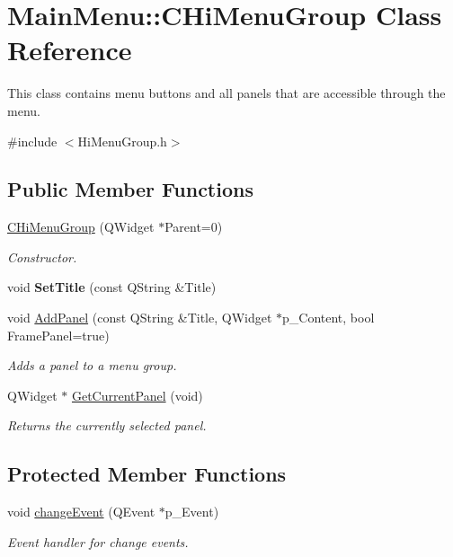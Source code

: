 \hypertarget{classMainMenu_1_1CHiMenuGroup}{\section{\-Main\-Menu\-:\-:\-C\-Hi\-Menu\-Group \-Class \-Reference}
\label{classMainMenu_1_1CHiMenuGroup}
}


\-This class contains menu buttons and all panels that are accessible through the menu.  




{\ttfamily \#include $<$\-Hi\-Menu\-Group.\-h$>$}

\subsection*{\-Public \-Member \-Functions}
\begin{DoxyCompactItemize}
\item 
\hyperlink{classMainMenu_1_1CHiMenuGroup_aaac78a584b5bbc709583957b60ecc8b9}{\-C\-Hi\-Menu\-Group} (\-Q\-Widget $\ast$\-Parent=0)
\begin{DoxyCompactList}\small\item\em \-Constructor. \end{DoxyCompactList}\item 
\hypertarget{classMainMenu_1_1CHiMenuGroup_ab48ee3eae074c54d57fbd2c24f73cbe0}{void {\bfseries \-Set\-Title} (const \-Q\-String \&\-Title)}\label{classMainMenu_1_1CHiMenuGroup_ab48ee3eae074c54d57fbd2c24f73cbe0}

\item 
void \hyperlink{classMainMenu_1_1CHiMenuGroup_a29b0779a9d6d633b3e3b5655f559ab07}{\-Add\-Panel} (const \-Q\-String \&\-Title, \-Q\-Widget $\ast$p\-\_\-\-Content, bool \-Frame\-Panel=true)
\begin{DoxyCompactList}\small\item\em \-Adds a panel to a menu group. \end{DoxyCompactList}\item 
\-Q\-Widget $\ast$ \hyperlink{classMainMenu_1_1CHiMenuGroup_a50449c470b8c9af058544b5b8037ff88}{\-Get\-Current\-Panel} (void)
\begin{DoxyCompactList}\small\item\em \-Returns the currently selected panel. \end{DoxyCompactList}\end{DoxyCompactItemize}
\subsection*{\-Protected \-Member \-Functions}
\begin{DoxyCompactItemize}
\item 
void \hyperlink{classMainMenu_1_1CHiMenuGroup_a04eb83e3f2bd9f1c50f25f5e0f669002}{change\-Event} (\-Q\-Event $\ast$p\-\_\-\-Event)
\begin{DoxyCompactList}\small\item\em \-Event handler for change events. \end{DoxyCompactList}\end{DoxyCompactItemize}


